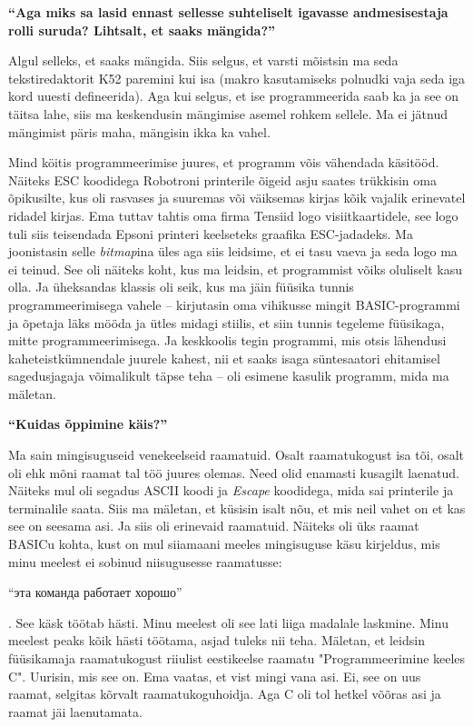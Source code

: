 \textbf{\enquote{Aga miks sa lasid ennast sellesse suhteliselt igavasse
andmesisestaja rolli suruda? Lihtsalt, et saaks mängida?}}

Algul selleks, et saaks mängida. Siis selgus, et varsti mõistsin ma seda
tekstiredaktorit K52 paremini kui isa (makro kasutamiseks polnudki vaja seda
iga kord uuesti defineerida). Aga kui selgus, et ise programmeerida saab ka ja
see on täitsa lahe, siis ma keskendusin mängimise asemel rohkem sellele. Ma ei
jätnud mängimist päris maha, mängisin ikka ka vahel.

Mind köitis programmeerimise juures, et programm võis vähendada käsitööd.
Näiteks ESC koodidega Robotroni printerile õigeid asju saates trükkisin oma õpikusilte, kus oli
rasvases ja suuremas või väiksemas kirjas kõik vajalik erinevatel ridadel
kirjas. Ema tuttav tahtis oma firma Tensiid logo visiitkaartidele, see logo tuli
siis teisendada Epsoni printeri keelseteks graafika ESC-jadadeks. Ma joonistasin selle
\emph{bitmap}ina üles aga siis leidsime, et ei tasu vaeva ja seda logo ma ei
teinud. See oli näiteks koht, kus ma leidsin, et programmist võiks oluliselt
kasu olla. Ja üheksandas klassis oli seik, kus ma jäin füüsika tunnis
programmeerimisega vahele -- kirjutasin oma vihikusse mingit BASIC-programmi ja
õpetaja läks mööda ja ütles midagi stiilis, et siin tunnis tegeleme füüsikaga,
mitte programmeerimisega. Ja keskkoolis tegin programmi, mis otsis lähendusi
kaheteistkümnendale juurele kahest, nii et saaks isaga süntesaatori ehitamisel
sagedusjagaja võimalikult täpse teha -- oli esimene kasulik programm, mida ma mäletan.

\textbf{\enquote{Kuidas õppimine käis?}}

Ma sain mingisuguseid venekeelseid raamatuid. Osalt raamatukogust isa tõi,
osalt oli ehk mõni raamat tal töö juures olemas. Need olid enamasti kusagilt
laenatud. Näiteks mul oli segadus ASCII koodi ja \emph{Escape} koodidega, mida
sai printerile ja terminalile saata. Siis ma mäletan, et küsisin isalt nõu, et
mis neil vahet on et kas see on seesama asi. Ja siis oli erinevaid raamatuid.
Näiteks oli üks raamat BASICu kohta, kust on mul siiamaani meeles mingisuguse
käsu kirjeldus, mis minu meelest ei sobinud niisugusesse raamatusse:
\begin{russian}\enquote{эта команда работает хорошо}\end{russian}. See käsk
töötab hästi. Minu meelest oli see lati liiga madalale laskmine. Minu meelest
peaks kõik hästi töötama, asjad tuleks nii teha.
Mäletan, et leidsin füüsikamaja raamatukogust riiulist eestikeelse raamatu
"Programmeerimine keeles C". Uurisin, mis see on. Ema vaatas, et vist mingi vana asi.
Ei, see on uus raamat, selgitas kõrvalt raamatukoguhoidja. Aga C oli tol hetkel
võõras asi ja raamat jäi laenutamata.

